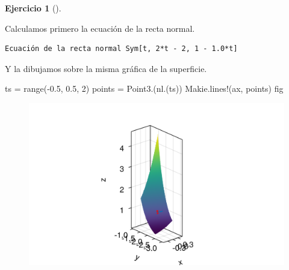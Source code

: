 \documentclass[
  a4paper,
]{scrreport}
\newenvironment{Shaded}{\begin{snugshade}}{\end{snugshade}}
\newcommand{\BuiltInTok}[1]{\textcolor[rgb]{0.00,0.23,0.31}{#1}}
\newcommand{\FloatTok}[1]{\textcolor[rgb]{0.68,0.00,0.00}{#1}}
\newcommand{\FunctionTok}[1]{\textcolor[rgb]{0.28,0.35,0.67}{#1}}
\newcommand{\ImportTok}[1]{\textcolor[rgb]{0.00,0.46,0.62}{#1}}
\newcommand{\NormalTok}[1]{\textcolor[rgb]{0.00,0.23,0.31}{#1}}
\newcommand{\OperatorTok}[1]{\textcolor[rgb]{0.37,0.37,0.37}{#1}}
\newcommand{\PreprocessorTok}[1]{\textcolor[rgb]{0.68,0.00,0.00}{#1}}
\newcommand{\SpecialCharTok}[1]{\textcolor[rgb]{0.37,0.37,0.37}{#1}}
\newcommand{\StringTok}[1]{\textcolor[rgb]{0.13,0.47,0.30}{#1}}
\theoremstyle{definition}
\newtheorem{exercise}{Ejercicio}[chapter]
\theoremstyle{remark}
\begin{document}
\begin{exercise}[]
\begin{tcolorbox}
\begin{figure}[H]
{}

\end{figure}

Calculamos primero la ecuación de la recta normal.

\begin{Shaded}
\end{Shaded}

\begin{verbatim}
Ecuación de la recta normal Sym[t, 2*t - 2, 1 - 1.0*t]
\end{verbatim}

Y la dibujamos sobre la misma gráfica de la superficie.

\begin{Shaded}
\begin{Highlighting}[]
\NormalTok{ts }\OperatorTok{=} \FunctionTok{range}\NormalTok{(}\OperatorTok{{-}}\FloatTok{0.5}\NormalTok{, }\FloatTok{0.5}\NormalTok{, }\FloatTok{2}\NormalTok{)}
\NormalTok{points }\OperatorTok{=} \FunctionTok{Point3}\NormalTok{.(}\FunctionTok{nl}\NormalTok{.(ts))}
\NormalTok{Makie.}\FunctionTok{lines!}\NormalTok{(ax, points)}
\NormalTok{fig}
\end{Highlighting}
\end{Shaded}

\begin{figure}[H]

{\centering \includegraphics{09-derivadas-funciones-varias-variables_files/figure-pdf/cell-30-output-1.png}

}
\end{figure}
\end{tcolorbox}
\end{exercise}
\end{document}
